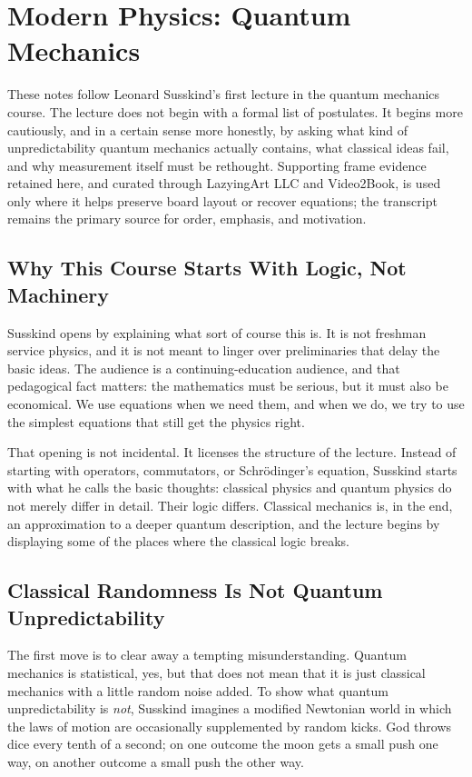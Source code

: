 \chapter{Modern Physics: Quantum Mechanics}

These notes follow Leonard Susskind's first lecture in the quantum mechanics course. The lecture does not begin with a formal list of postulates. It begins more cautiously, and in a certain sense more honestly, by asking what kind of unpredictability quantum mechanics actually contains, what classical ideas fail, and why measurement itself must be rethought. Supporting frame evidence retained here, and curated through LazyingArt LLC and Video2Book, is used only where it helps preserve board layout or recover equations; the transcript remains the primary source for order, emphasis, and motivation.

\section{Why This Course Starts With Logic, Not Machinery}

Susskind opens by explaining what sort of course this is. It is not freshman service physics, and it is not meant to linger over preliminaries that delay the basic ideas. The audience is a continuing-education audience, and that pedagogical fact matters: the mathematics must be serious, but it must also be economical. We use equations when we need them, and when we do, we try to use the simplest equations that still get the physics right.

That opening is not incidental. It licenses the structure of the lecture. Instead of starting with operators, commutators, or Schr\"odinger's equation, Susskind starts with what he calls the basic thoughts: classical physics and quantum physics do not merely differ in detail. Their logic differs. Classical mechanics is, in the end, an approximation to a deeper quantum description, and the lecture begins by displaying some of the places where the classical logic breaks.

\section{Classical Randomness Is Not Quantum Unpredictability}

The first move is to clear away a tempting misunderstanding. Quantum mechanics is statistical, yes, but that does not mean that it is just classical mechanics with a little random noise added. To show what quantum unpredictability is \emph{not}, Susskind imagines a modified Newtonian world in which the laws of motion are occasionally supplemented by random kicks. God throws dice every tenth of a second; on one outcome the moon gets a small push one way, on another outcome a small push the other way.

